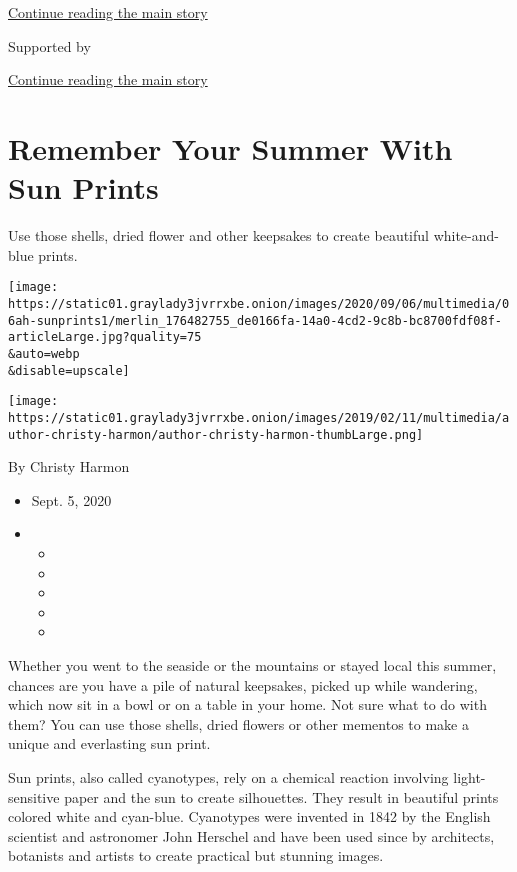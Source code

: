 \protect\hyperlink{after-top}{Continue reading the main story}

Supported by

\protect\hyperlink{after-sponsor}{Continue reading the main story}

\hypertarget{remember-your-summer-with-sun-prints}{%
\section{Remember Your Summer With Sun
Prints}\label{remember-your-summer-with-sun-prints}}

Use those shells, dried flower and other keepsakes to create beautiful
white-and-blue prints.

\texttt{[image: https://static01.graylady3jvrrxbe.onion/images/2020/09/06/multimedia/06ah-sunprints1/merlin\_176482755\_de0166fa-14a0-4cd2-9c8b-bc8700fdf08f-articleLarge.jpg?quality=75\\\&auto=webp\\\&disable=upscale]}

\texttt{[image: https://static01.graylady3jvrrxbe.onion/images/2019/02/11/multimedia/author-christy-harmon/author-christy-harmon-thumbLarge.png]}

By Christy Harmon

\begin{itemize}
\item
  Sept. 5, 2020
\item
  \begin{itemize}
  \item
  \item
  \item
  \item
  \item
  \end{itemize}
\end{itemize}

Whether you went to the seaside or the mountains or stayed local this
summer, chances are you have a pile of natural keepsakes, picked up
while wandering, which now sit in a bowl or on a table in your home. Not
sure what to do with them? You can use those shells, dried flowers or
other mementos to make a unique and everlasting sun print.

Sun prints, also called cyanotypes, rely on a chemical reaction
involving light-sensitive paper and the sun to create silhouettes. They
result in beautiful prints colored white and cyan-blue. Cyanotypes were
invented in 1842 by the English scientist and astronomer John Herschel
and have been used since by architects, botanists and artists to create
practical but stunning images.

